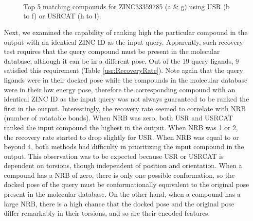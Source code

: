 \begin{figure}
\centering
{}
\\
\\
\\
\caption{Top 5 matching compounds for ZINC33359785 (a \& g) using USR (b to f) or USRCAT (h to l).}
\label{usr:ZINC33359785}
\end{figure}

Next, we examined the capability of ranking high the particular compound in the output with an identical ZINC ID as the input query. Apparently, such recovery test requires that the query compound must be present in the molecular database, although it can be in a different pose. Out of the 19 query ligands, 9 satisfied this requirement (Table \ref{usr:RecoveryRate}). Note again that the query ligands were in their docked pose while the compounds in the molecular database were in their low energy pose, therefore the corresponding compound with an identical ZINC ID as the input query was not always guaranteed to be ranked the first in the output. Interestingly, the recovery rate seemed to correlate with NRB (number of rotatable bonds). When NRB was zero, both USR and USRCAT ranked the input compound the highest in the output. When NRB was 1 or 2, the recovery rate started to drop slightly for USR. When NRB was equal to or beyond 4, both methods had difficulty in prioritizing the input compound in the output. This observation was to be expected because USR or USRCAT is dependent on torsions, though independent of position and orientation. When a compound has a NRB of zero, there is only one possible conformation, so the docked pose of the query must be conformationally equivalent to the original pose present in the molecular database. On the other hand, when a compound has a large NRB, there is a high chance that the docked pose and the original pose differ remarkably in their torsions, and so are their encoded features.

